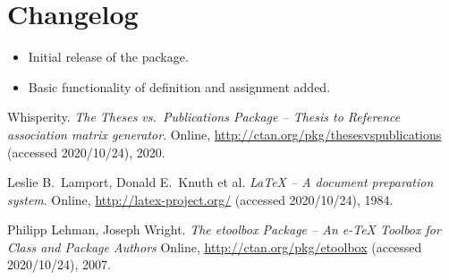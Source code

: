 \documentclass{article}
\begin{document}
\section{Changelog}\label{changelog}
\begin{itemize}
    \item Initial release of the package.
    \item Basic functionality of definition and assignment added.
\end{itemize}


\begin{thebibliography}{3}
Whisperity. \textit{The \textsf{Theses vs.\ Publications} Package -- Thesis to Reference association matrix generator}.
Online, \url{http://ctan.org/pkg/thesesvspublications} (accessed 2020/10/24), 2020.

Leslie B.\ Lamport, Donald E.\ Knuth et al. 
\textit{\LaTeX{} -- A document preparation system}. 
Online, \url{http://latex-project.org/} (accessed 2020/10/24), 1984.

Philipp Lehman, Joseph Wright.
\textit{The \textsf{etoolbox} Package -- An e-\TeX{} Toolbox for Class and Package Authors}
Online, \url{http://ctan.org/pkg/etoolbox} (accessed 2020/10/24), 2007.
\end{thebibliography}
\end{document}
